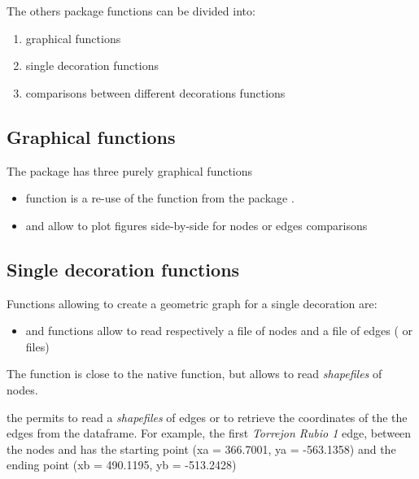 \documentclass[article]{jss}\usepackage[]{graphicx}\usepackage[]{color}
\begin{document}
The others  package functions can be divided into:
\begin{enumerate}
 \item graphical functions
 \item single decoration functions
 \item comparisons between different decorations functions
\end{enumerate}

\subsection{Graphical functions} \label{sec:functions_gr}

The  package has three purely graphical functions
\begin{itemize}
\setlength\itemsep{.1em}
\item {} function is a re-use of the  function from the  package \citep{Snow20}.
\item {} and  allow to plot figures side-by-side for nodes or edges comparisons
\end{itemize}

\subsection{Single decoration functions} \label{sec:functions_one}

Functions allowing to create a geometric graph for a single decoration are:

\begin{itemize}
\setlength\itemsep{.1em}
  \item {} and  functions allow to read respectively a file of nodes and a file of edges ( or  files)
\end{itemize}

The  function is close to the native   function, but allows to read \emph{shapefiles} of nodes.

the  permits to read a \emph{shapefiles} of edges or to retrieve the coordinates of the the edges from the  dataframe. For example, the first \emph{Torrejon Rubio 1} edge, between the nodes  and  has
the starting point (xa = 366.7001, ya = -563.1358) and the ending point (xb = 490.1195, yb = -513.2428)
\end{document}
